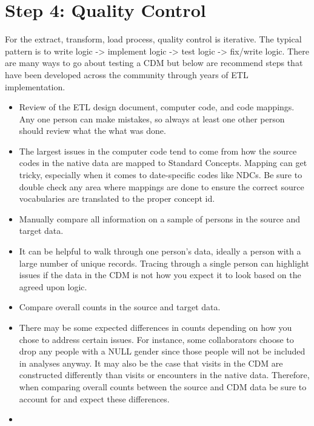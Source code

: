 \documentclass[11pt]{book}
\providecommand{\tightlist}{%
  \setlength{\itemsep}{0pt}\setlength{\parskip}{0pt}}
\theoremstyle{definition}
\theoremstyle{definition}
\theoremstyle{definition}
\theoremstyle{remark}
\begin{document}
\section{Step 4: Quality Control}\label{step-4-quality-control}

For the extract, transform, load process, quality control is iterative.
The typical pattern is to write logic -\textgreater{} implement logic
-\textgreater{} test logic -\textgreater{} fix/write logic. There are
many ways to go about testing a CDM but below are recommend steps that
have been developed across the community through years of ETL
implementation. 

\begin{itemize}
\tightlist
\item
  Review of the ETL design document, computer code, and code mappings.
  Any one person can make mistakes, so always at least one other person
  should review what the what was done.
\item
  The largest issues in the computer code tend to come from how the
  source codes in the native data are mapped to Standard Concepts.
  Mapping can get tricky, especially when it comes to date-specific
  codes like NDCs. Be sure to double check any area where mappings are
  done to ensure the correct source vocabularies are translated to the
  proper concept id.\\
\item
  Manually compare all information on a sample of persons in the source
  and target data.
\item
  It can be helpful to walk through one person's data, ideally a person
  with a large number of unique records. Tracing through a single person
  can highlight issues if the data in the CDM is not how you expect it
  to look based on the agreed upon logic.
\item
  Compare overall counts in the source and target data.
\item
  There may be some expected differences in counts depending on how you
  chose to address certain issues. For instance, some collaborators
  choose to drop any people with a NULL gender since those people will
  not be included in analyses anyway. It may also be the case that
  visits in the CDM are constructed differently than visits or
  encounters in the native data. Therefore, when comparing overall
  counts between the source and CDM data be sure to account for and
  expect these differences.\\
\item

\end{itemize}
\end{document}
